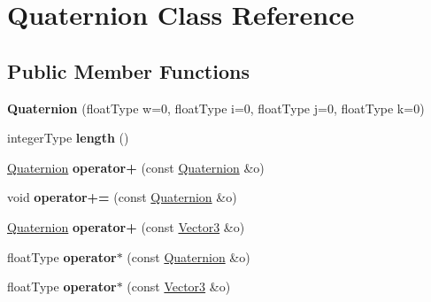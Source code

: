 \hypertarget{classQuaternion}{\section{Quaternion Class Reference}
\label{classQuaternion}
}
\subsection*{Public Member Functions}
\begin{DoxyCompactItemize}
\item 
\hypertarget{classQuaternion_a07233471ee496ee86defe2977762751c}{{\bfseries Quaternion} (float\-Type w=0, float\-Type i=0, float\-Type j=0, float\-Type k=0)}\label{classQuaternion_a07233471ee496ee86defe2977762751c}

\item 
\hypertarget{classQuaternion_af4a785e306bbb0a3827dc81fc2f200a2}{integer\-Type {\bfseries length} ()}\label{classQuaternion_af4a785e306bbb0a3827dc81fc2f200a2}

\item 
\hypertarget{classQuaternion_ae311a760ae82049ecca03921da681a7e}{\hyperlink{classQuaternion}{Quaternion} {\bfseries operator+} (const \hyperlink{classQuaternion}{Quaternion} \&o)}\label{classQuaternion_ae311a760ae82049ecca03921da681a7e}

\item 
\hypertarget{classQuaternion_ad1134f29d7dbbe30f219dfea90dffc70}{void {\bfseries operator+=} (const \hyperlink{classQuaternion}{Quaternion} \&o)}\label{classQuaternion_ad1134f29d7dbbe30f219dfea90dffc70}

\item 
\hypertarget{classQuaternion_ace3b43b630e7de9618a66bb78c1e99d6}{\hyperlink{classQuaternion}{Quaternion} {\bfseries operator+} (const \hyperlink{classVector3}{Vector3} \&o)}\label{classQuaternion_ace3b43b630e7de9618a66bb78c1e99d6}

\item 
\hypertarget{classQuaternion_abbd31637ce4606eac3a76f665ce3b569}{float\-Type {\bfseries operator$\ast$} (const \hyperlink{classQuaternion}{Quaternion} \&o)}\label{classQuaternion_abbd31637ce4606eac3a76f665ce3b569}

\item 
\hypertarget{classQuaternion_a86a73bf4296c2d95e35e7cadf52f55e0}{float\-Type {\bfseries operator$\ast$} (const \hyperlink{classVector3}{Vector3} \&o)}\label{classQuaternion_a86a73bf4296c2d95e35e7cadf52f55e0}


\end{DoxyCompactItemize}
